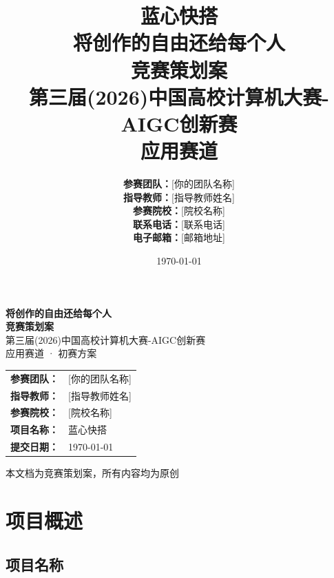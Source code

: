 \documentclass[a4paper,12pt]{ctexart}
\title{
    \vspace{2cm}
    {\Huge\bfseries\color{darkblue} 蓝心快搭} \\[0.5cm]
    {\LARGE\color{vivoblue} 将创作的自由还给每个人} \\[2cm]
    {\Large 竞赛策划案} \\[1cm]
    {\large 第三届(2026)中国高校计算机大赛-AIGC创新赛} \\[0.5cm]
    {\large 应用赛道}
}
\author{
    \vspace{2cm}
    {\large\textbf{参赛团队：}}[你的团队名称] \\[0.5cm]
    {\large\textbf{指导教师：}}[指导教师姓名] \\[0.5cm]
    {\large\textbf{参赛院校：}}[院校名称] \\[0.5cm]
    {\large\textbf{联系电话：}}[联系电话] \\[0.5cm]
    {\large\textbf{电子邮箱：}}[邮箱地址]
}
\date{\today}
\begin{document}
\begin{titlepage}
    \centering
    \vspace*{1cm}


    \vspace{1cm}

    {\LARGE\color{vivoblue} \textbf{将创作的自由还给每个人}} \\[2cm]

    {\Huge\bfseries\color{darkblue} 竞赛策划案} \\[1.5cm]

    {\Large 第三届(2026)中国高校计算机大赛-AIGC创新赛} \\[0.5cm]
    {\Large 应用赛道 · 初赛方案}

    \vspace{3cm}

    \begin{tabular}{rl}
        \textbf{参赛团队：} & [你的团队名称] \\
        \textbf{指导教师：} & [指导教师姓名] \\
        \textbf{参赛院校：} & [院校名称] \\
        \textbf{项目名称：} & 蓝心快搭 \\
        \textbf{提交日期：} & \today \\
    \end{tabular}

    \vfill
    {\small 本文档为竞赛策划案，所有内容均为原创}
\end{titlepage}

\newpage
\tableofcontents
\thispagestyle{empty}
\newpage

\setcounter{page}{1}

\section{项目概述}

\subsection{项目名称}
\end{document}
